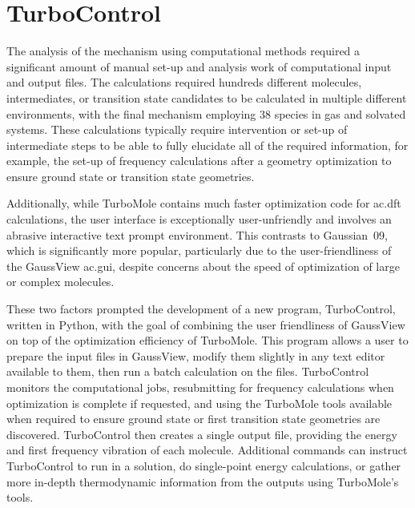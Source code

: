 \chapter{TurboControl}\label{chap.turbocontrol}

The analysis of the mechanism using computational methods required a significant amount of manual set-up and analysis work of computational input and output files. The calculations required hundreds different molecules, intermediates, or transition state candidates to be calculated in multiple different environments, with the final mechanism employing 38 species in gas and solvated systems. These calculations typically require intervention or set-up of intermediate steps to be able to fully elucidate all of the required information, for example, the set-up of frequency calculations after a geometry optimization to ensure ground state or transition state geometries. 

Additionally, while TurboMole contains much faster optimization code for \gls{ac.dft} calculations, the user interface is exceptionally user-unfriendly and involves an abrasive interactive text prompt environment. This contrasts to Gaussian~09, which is significantly more popular, particularly due to the user-friendliness of the GaussView \gls{ac.gui}, despite concerns about the speed of optimization of large or complex molecules.

These two factors prompted the development of a new program, TurboControl, written in Python, with the goal of combining the user friendliness of GaussView on top of the optimization efficiency of TurboMole. This program allows a user to prepare the input files in GaussView, modify them slightly in any text editor available to them, then run a batch calculation on the files. TurboControl monitors the computational jobs, resubmitting for frequency calculations when optimization is complete if requested, and using the TurboMole tools available when required to ensure ground state or first transition state geometries are discovered. TurboControl then creates a single output file, providing the energy and first frequency vibration of each molecule. Additional commands can instruct TurboControl to run in a solution, do single-point energy calculations, or gather more in-depth thermodynamic information from the outputs using TurboMole's tools. 

